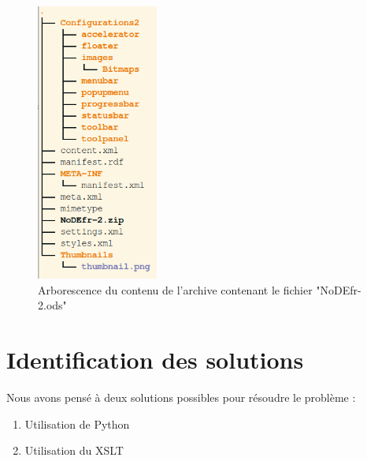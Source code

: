 \documentclass[11pt]{report}
\begin{document}
\begin{figure}[H]
    \centering
    \includegraphics[width=4cm]{arborescence}
    \caption{Arborescence du contenu de l'archive contenant le fichier "NoDEfr-2.ods" }
    \label{fig:mesh1}
\end{figure}



\chapter{Identification des solutions}

Nous avons pensé à deux solutions possibles pour résoudre le problème :
\begin{enumerate}
    \item Utilisation de Python
    \item Utilisation du XSLT
\end{enumerate}
\end{document}

